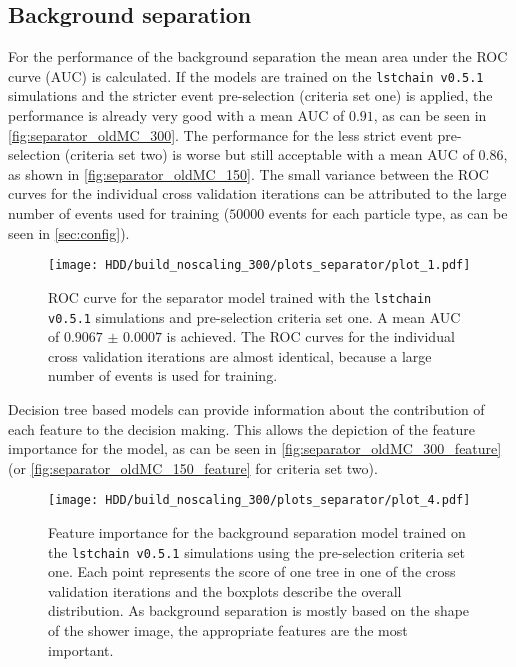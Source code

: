 \subsection{Background separation}
For the performance of the background separation the mean area under the ROC curve (AUC) is calculated.
If the models are trained on the \texttt{lstchain v0.5.1} simulations and the stricter event pre-selection (criteria set one) is applied,
the performance is already very good with a mean AUC of $\num{0.91}$, as can be seen in \autoref{fig:separator_oldMC_300}.
The performance for the less strict event pre-selection (criteria set two) is worse but still acceptable with a mean AUC of $\num{0.86}$, as shown in
\autoref{fig:separator_oldMC_150}. The small variance between the ROC curves for the individual cross validation iterations 
can be attributed to the large number of events used for training ($\num{50000}$ events for each particle type, as can be seen in \autoref{sec:config}). 
\begin{figure}
    \centering
    \texttt{[image: HDD/build\_noscaling\_300/plots\_separator/plot\_1.pdf]}
    \caption{ROC curve for the separator model trained with the \texttt{lstchain v0.5.1} simulations and pre-selection criteria set one.
        A mean AUC of $\num{0.9067(7)}$ is achieved. 
        The ROC curves for the individual cross validation iterations are almost identical, because a large number of events is used for training.
    }
    \label{fig:separator_oldMC_300}
\end{figure}

Decision tree based models can provide information about the contribution of each feature to the decision making.
This allows the depiction of the feature importance for the model, as can be seen in \autoref{fig:separator_oldMC_300_feature} 
(or \autoref{fig:separator_oldMC_150_feature} for criteria set two).
\begin{figure}
    \centering
    \texttt{[image: HDD/build\_noscaling\_300/plots\_separator/plot\_4.pdf]}
    \caption{Feature importance for the background separation model trained on the \texttt{lstchain v0.5.1} simulations using the pre-selection criteria set one.
        Each point represents the score of one tree in one of the cross validation iterations and the boxplots describe the overall distribution.
        As background separation is mostly based on the shape of the shower image, the appropriate features are the most important.
    }
    \label{fig:separator_oldMC_300_feature}
\end{figure}

